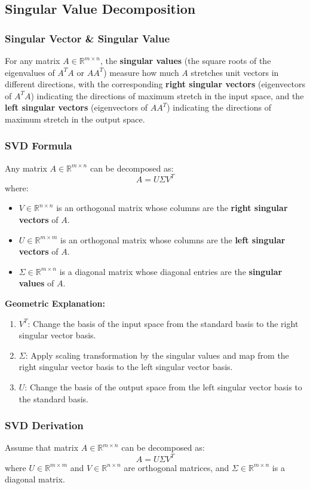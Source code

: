 \documentclass{article}
\begin{document}
\subsection{Singular Value Decomposition}

\subsubsection{Singular Vector \& Singular Value}
For any matrix $A \in \mathbb{R}^{m \times n}$, the \textbf{singular values} (the square roots of the eigenvalues of $A^T A$ or $AA^T$) measure how much $A$ stretches unit vectors in different directions, with the corresponding \textbf{right singular vectors} (eigenvectors of $A^T A$) indicating the directions of maximum stretch in the input space, and the \textbf{left singular vectors} (eigenvectors of $AA^T$) indicating the directions of maximum stretch in the output space.

\subsubsection{SVD Formula}
Any matrix $A \in \mathbb{R}^{m \times n}$ can be decomposed as:
\[
    A = U \Sigma V^T
\]
where:
\begin{itemize}
    \item $V \in \mathbb{R}^{n \times n}$ is an orthogonal matrix whose columns are the \textbf{right singular vectors} of $A$.
    \item $U \in \mathbb{R}^{m \times m}$ is an orthogonal matrix whose columns are the \textbf{left singular vectors} of $A$.
    \item $\Sigma \in \mathbb{R}^{m \times n}$ is a diagonal matrix whose diagonal entries are the \textbf{singular values} of $A$.
\end{itemize}
\textbf{Geometric Explanation:}
\begin{enumerate}
    \item $V^T$: Change the basis of the input space from the standard basis to the right singular vector basis.
    \item $\Sigma$: Apply scaling transformation by the singular values and map from the right singular vector basis to the left singular vector basis.
    \item $U$: Change the basis of the output space from the left singular vector basis to the standard basis.
\end{enumerate}


\subsubsection{SVD Derivation}
Assume that matrix $A \in \mathbb{R}^{m \times n}$ can be decomposed as:
\[
    A = U \Sigma V^T
\]
where $U \in \mathbb{R}^{m \times m}$ and $V \in \mathbb{R}^{n \times n}$ are orthogonal matrices, and $\Sigma \in \mathbb{R}^{m \times n}$ is a diagonal matrix.
\end{document}
